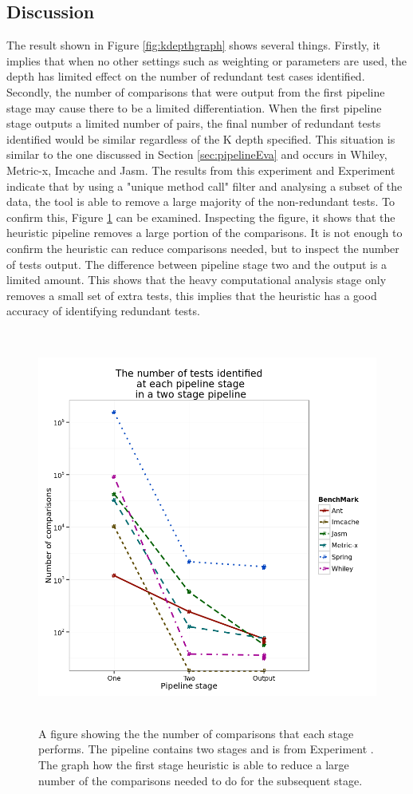\documentclass[11pt
              , a4paper
              , twoside
              , openright
              ]{report}
\newcommand{\rom}[1]{\uppercase\expandafter{\romannumeral #1\relax}}
\begin{document}
\subsection{Discussion}
The result shown in Figure \ref{fig:kdepthgraph} shows several things. Firstly, it implies that when no other settings such as weighting or parameters are used, the depth has limited effect on the number of redundant test cases identified. Secondly, the number of comparisons that were output from the first pipeline stage may cause there to be a limited differentiation. When the first pipeline stage outputs a limited number of pairs, the final number of redundant tests identified would be similar regardless of the K depth specified. This situation is similar to the one discussed in Section \ref{sec:pipelineEva} and occurs in Whiley, Metric-x, Imcache and Jasm. The results from this experiment and Experiment \rom{1} indicate that by using a "unique method call" filter and analysing a subset of the data, the tool is able to remove a large majority of the non-redundant tests. To confirm this, Figure \ref{fig:stagesinpipeline} can be examined. Inspecting the figure, it shows that the heuristic pipeline removes a large portion of the comparisons. It is not enough to confirm the heuristic can reduce comparisons needed, but to inspect the number of tests output. The difference between pipeline stage two and the output is a limited amount. This shows that the heavy computational analysis stage only removes a small set of extra tests, this implies that the heuristic has a good accuracy of identifying redundant tests.

\begin{figure}[h]
\centering
\includegraphics[width=\textwidth,height=13cm]{stagesinpipeline.png}
\caption{A figure showing the the number of comparisons that each stage performs. The pipeline contains two stages and is from Experiment \rom{2}. The graph how the first stage heuristic is able to reduce a large number of the comparisons needed to do for the subsequent stage.}
\label{fig:stagesinpipeline}
\end{figure}
\end{document}

